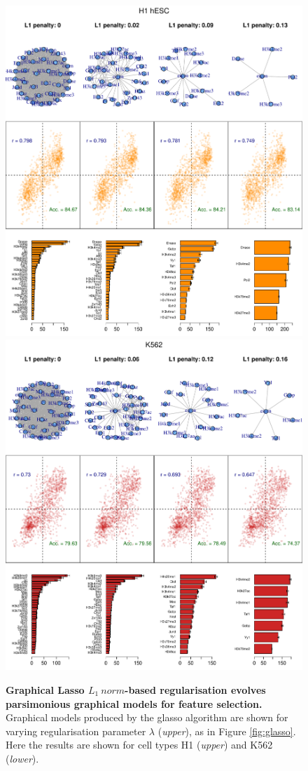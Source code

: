 \documentclass[a4paper]{report}
\begin{document}
\begin{figure}[H]
\begin{center}
\includegraphics[width=.65\textwidth]{figs/sH1_glasso.pdf}
\includegraphics[width=.65\textwidth]{figs/sK562_glasso}
\captionsetup{width=1\textwidth}
\caption{  {\bf Graphical Lasso $L_1~norm$-based regularisation evolves
    parsimonious graphical models for feature selection.}  Graphical
  models produced by the glasso algorithm are shown for 
  varying regularisation parameter $\lambda$ (\emph{upper}), as in
  Figure \ref{fig:glasso}. Here the results are shown for cell types H1
  (\emph{upper}) and K562 (\emph{lower}).
} \label{fig:suppGlasso}
\end{center} 
\end{figure} 
\end{document}
